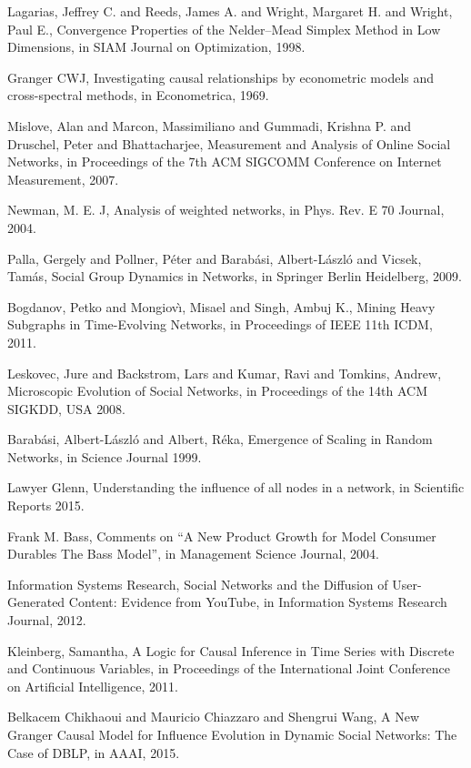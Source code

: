 \documentclass[smallextended]{svjour3}       %
\theoremstyle{definition}
\begin{document}
\begin{thebibliography}{}
{Lagarias, Jeffrey C. and Reeds, James A. and Wright, Margaret H. and Wright, Paul E.},
Convergence Properties of the  Nelder--Mead Simplex Method in Low Dimensions,
in SIAM Journal on Optimization,
{1998.}

{Granger CWJ},
Investigating causal relationships by econometric models and cross-spectral
methods,
in Econometrica,
{1969.}

{Mislove, Alan and Marcon, Massimiliano and Gummadi, Krishna P. and Druschel, Peter and Bhattacharjee},
Measurement and Analysis of Online Social Networks, 
in Proceedings of the 7th ACM SIGCOMM Conference on Internet Measurement,
{2007.}

{Newman, M. E. J},
Analysis of weighted networks, 
in Phys. Rev. E 70 Journal,
{2004.}

{Palla, Gergely
	and Pollner, P{\'e}ter
	and Barab{\'a}si, Albert-L{\'a}szl{\'o}
	and Vicsek, Tam{\'a}s},
Social Group Dynamics in Networks, 
in Springer Berlin Heidelberg,
{2009.}

{Bogdanov, Petko and Mongiov\`{\i}, Misael and Singh, Ambuj K.},
Mining Heavy Subgraphs in Time-Evolving Networks, 
in Proceedings of IEEE 11th ICDM,
{2011.}

{Leskovec, Jure and Backstrom, Lars and Kumar, Ravi and Tomkins, Andrew},
Microscopic Evolution of Social Networks, 
in Proceedings of the 14th ACM SIGKDD, USA
{2008.}

{Barab{\'a}si, Albert-L{\'a}szl{\'o} and Albert, R{\'e}ka},
Emergence of Scaling in Random Networks, 
in Science Journal 
{1999.}

{Lawyer Glenn},
Understanding the influence of all nodes in a network, 
in Scientific Reports
{2015.}

{Frank M. Bass},
Comments on ``A New Product Growth for Model Consumer Durables The Bass Model'', 
	in Management Science Journal,
{2004.}

{Information Systems Research},
Social Networks and the Diffusion of User-Generated Content: Evidence from YouTube, 
in Information Systems Research Journal,
{2012.}

{Kleinberg, Samantha},
A Logic for Causal Inference in Time Series with Discrete and Continuous Variables, 
in Proceedings of the International Joint Conference on Artificial Intelligence,
{2011.}

{Belkacem Chikhaoui and Mauricio Chiazzaro and Shengrui Wang},
A New Granger Causal Model for Influence Evolution in Dynamic Social Networks: The Case of DBLP, 
in AAAI,
{2015.}

\end{thebibliography}
\end{document}
